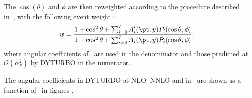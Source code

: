 The $\cos(\theta)$ and $\phi$ are then reweighted according to the procedure described in~\cite{STDM-2014-18}, with the following event weight :
\begin{equation}
\label{eqn:weight_pol}
w = \frac{1+\cos^2\theta + \sum_{i=0}^7 A_i'(\pt,y)P_i(\cos\theta,\phi)}{1+\cos^2\theta + \sum_{i=0}^7 A_i(\pt,y)P_i(\cos\theta,\phi)},
\end{equation}
where angular coefficients of \PowPythia\ are used in the denominator and those predicted at $\mathcal{O}(\alpha_S^2)$ by DYTURBO in the numerator.

The angular coefficients in DYTURBO at NLO, NNLO and in \PowPythia\ are shown as a function of \pttruthv\ in figures .
